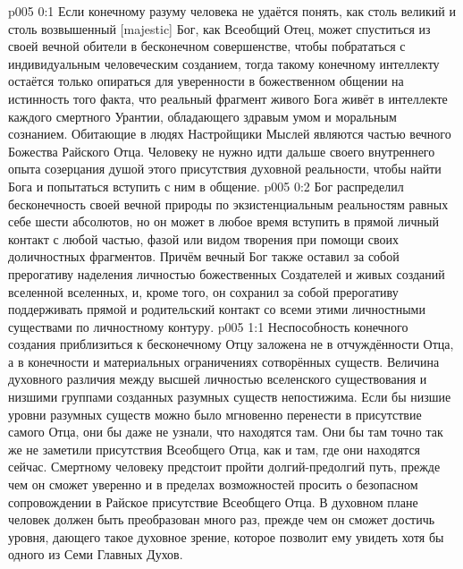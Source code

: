 \author{Божественный Советник}
\vs p005 0:1 Если конечному разуму человека не удаётся понять, как столь великий и столь возвышенный [majestic] Бог, как Всеобщий Отец, может спуститься из своей вечной обители в бесконечном совершенстве, чтобы побрататься с индивидуальным человеческим созданием, тогда такому конечному интеллекту остаётся только опираться для уверенности в божественном общении на истинность того факта, что реальный фрагмент живого Бога живёт в интеллекте каждого смертного Урантии, обладающего здравым умом и моральным сознанием. Обитающие в людях Настройщики Мыслей являются частью вечного Божества Райского Отца. Человеку не нужно идти дальше своего внутреннего опыта созерцания душой этого присутствия духовной реальности, чтобы найти Бога и попытаться вступить с ним в общение.
\vs p005 0:2 Бог распределил бесконечность своей вечной природы по экзистенциальным реальностям равных себе шести абсолютов, но он может в любое время вступить в прямой личный контакт с любой частью, фазой или видом творения при помощи своих доличностных фрагментов. Причём вечный Бог также оставил за собой прерогативу наделения личностью божественных Создателей и живых созданий вселенной вселенных, и, кроме того, он сохранил за собой прерогативу поддерживать прямой и родительский контакт со всеми этими личностными существами по личностному контуру.
\vs p005 1:1 Неспособность конечного создания приблизиться к бесконечному Отцу заложена не в отчуждённости Отца, а в конечности и материальных ограничениях сотворённых существ. Величина духовного различия между высшей личностью вселенского существования и низшими группами созданных разумных существ непостижима. Если бы низшие уровни разумных существ можно было мгновенно перенести в присутствие самого Отца, они бы даже не узнали, что находятся там. Они бы там точно так же не заметили присутствия Всеобщего Отца, как и там, где они находятся сейчас. Смертному человеку предстоит пройти долгий\hyp{}предолгий путь, прежде чем он сможет уверенно и в пределах возможностей просить о безопасном сопровождении в Райское присутствие Всеобщего Отца. В духовном плане человек должен быть преобразован много раз, прежде чем он сможет достичь уровня, дающего такое духовное зрение, которое позволит ему увидеть хотя бы одного из Семи Главных Духов.
